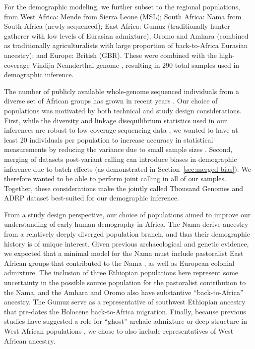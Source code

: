 \documentclass[]{article}
\begin{document}
For the demographic modeling, we further subset to the regional populations,
from West Africa: Mende from Sierra Leone (MSL); South Africa: Nama from South
Africa (newly sequenced); East Africa: Gumuz (traditionally hunter-gatherer
with low levels of Eurasian admixture), Oromo and Amhara (combined as
traditionally agriculturalists with large proportion of back-to-Africa Eurasian
ancestry); and Europe: British (GBR). These were combined with the
high-coverage Vindija Neanderthal genome \citep{Prufer2017-kk}, resulting in
290 total samples used in demographic inference.

The number of publicly available whole-genome sequenced individuals from a
diverse set of African groups has grown in recent years
\citep[e.g.,][]{Mallick2016-lx,Bergstrom2020-cy,Schlebusch2020-zo}. Our choice
of populations was motivated by both technical and study design considerations.
First, while the diversity and linkage disequilibrium statistics used in our
inferences are robust to low coverage sequencing data \citep{Ragsdale2019-nt},
we wanted to have at least 20 individuals per population to increase accuracy
in statistical measurements by reducing the variance due to small sample sizes
\citep{Ragsdale2020-nz}. Second, merging of datasets post-variant calling can
introduce biases in demographic inference due to batch effects (as demonstrated
in Section~\ref{sec:merged-bias}). We therefore wanted to be able to perform
joint calling in all of our samples. Together, these considerations make the
jointly called Thousand Genomes and ADRP dataset best-suited for our
demographic inference.

From a study design perspective, our choice of populations aimed to improve our
understanding of early human demography in Africa. The Nama derive ancestry
from a relatively deeply diverged population branch, and thus their demographic
history is of unique interest. Given previous archaeological and genetic
evidence, we expected that a minimal model for the Nama must include
pastoralist East African groups that contributed to the Nama
\citep[e.g.,][]{Uren2016-nn}, as well as European colonial admixture.  The
inclusion of three Ethiopian populations here represent some uncertainty in the
possible source population for the pastoralist contribution to the Nama, and
the Amhara and Oromo also have substantive ``back-to-Africa'' ancestry. The
Gumuz serve as a representative of southwest Ethiopian ancestry that pre-dates
the Holocene back-to-Africa migration. Finally, because previous studies have
suggested a role for ``ghost'' archaic admixture or deep structure in West
African populations \citep[e.g.,][]{Speidel2019-nj,Durvasula2020-td}, we chose
to also include representatives of West African ancestry.
\end{document}
